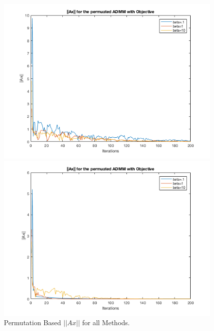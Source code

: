 \documentclass[answers]{exam}
\begin{document}
\begin{itemize}
\begin{framed}
 
\begin{figure}[H]
    \centering
    \caption{Permutation Based $||Ax||$ for all Methods.}
    \begin{minipage}{.5\textwidth}
        \centering
        \includegraphics[width=1.1\textwidth, height=0.3\textheight]{Problem7_113a.png}
    \end{minipage}%
    \begin{minipage}{0.5\textwidth}
        \centering
        \includegraphics[width=1.1\textwidth, height=0.3\textheight]{Problem7_114a.png}
    \end{minipage}
    \label{normperm}
\end{figure}


\end{framed}
\end{itemize}
\end{document}
